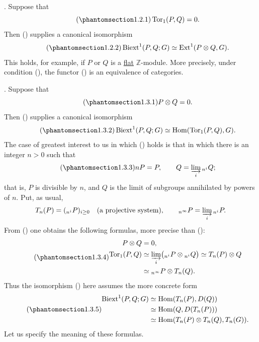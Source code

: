 . Suppose that
\begin{equation}\tag{\SGARefTarget{sga7.sga7i.eviii.n1-2-1}{1.2.1}}
 \Tor_1(P,Q)=0.
\end{equation}
Then () supplies a canonical isomorphism
\begin{equation}\tag{\SGARefTarget{sga7.sga7i.eviii.n1-2-2}{1.2.2}}
 \Biext^1(P,Q;G)\simeq\Ext^1(P\otimes Q,G).
\end{equation}
This holds, for example, if $P$ or $Q$ is a \underline{flat}
$\mathbb Z$-module.  More precisely, under condition (), the
functor () is an equivalence of categories.

. Suppose that
\begin{equation}\tag{\SGARefTarget{sga7.sga7i.eviii.n1-3-1}{1.3.1}}
 P\otimes Q=0.
\end{equation}
Then () supplies a canonical isomorphism
\begin{equation}\tag{\SGARefTarget{sga7.sga7i.eviii.n1-3-2}{1.3.2}}
 \Biext^1(P,Q;G)\simeq\Hom(\Tor_1(P,Q),G).
\end{equation}
The case of greatest interest to us in which () holds is that in
which there is an integer $n>0$ such that
\begin{equation}\tag{\SGARefTarget{sga7.sga7i.eviii.n1-3-3}{1.3.3}}
 nP=P,\qquad
 Q=\varinjlim_i {}_{n^i}Q;
\end{equation}
that is, $P$ is divisible by $n$, and $Q$ is the limit of subgroups
annihilated by powers of $n$.  Put, as usual,
\[
 T_n(P)=({}_{n^i}P)_{i\geq0}\quad\text{(a projective system)},\qquad
 {}_{n^\infty}P=\varinjlim_i{}_{n^i}P.
\]
From () one obtains the following formulas, more precise than
():
\begin{equation}\tag{\SGARefTarget{sga7.sga7i.eviii.n1-3-4}{1.3.4}}
\begin{split}
 P\otimes Q&=0,\\
 \Tor_1(P,Q)
 &\simeq\varinjlim_i
   \bigl({}_{n^i}P\otimes{}_{n^i}Q\bigr)
 \simeq T_n(P)\otimes Q\\
 &\simeq{}_{n^\infty}P\otimes T_n(Q).
\end{split}
\end{equation}
Thus the isomorphism () here assumes the more concrete form
\begin{equation}\tag{\SGARefTarget{sga7.sga7i.eviii.n1-3-5}{1.3.5}}
\begin{split}
 \Biext^1(P,Q;G)
 &\simeq\Hom(T_n(P),D(Q))\\
 &\simeq\Hom(Q,D(T_n(P)))\\
 &\simeq\Hom(T_n(P)\otimes T_n(Q),T_n(G)).
\end{split}
\end{equation}
Let us specify the meaning of these formulas.

